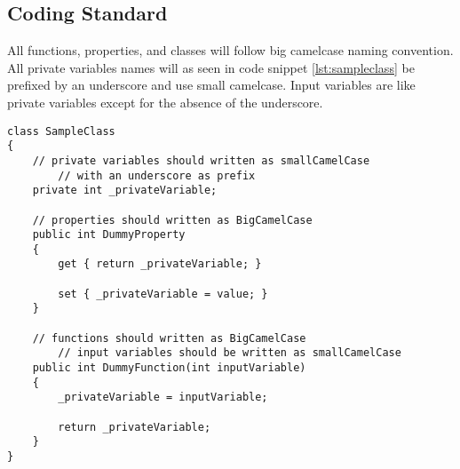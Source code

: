 \subsection{Coding Standard}
\label{subsec:coding_standard}
All functions, properties, and classes will follow big camelcase naming convention.
All private variables names will as seen in code snippet \ref{lst:sampleclass} be prefixed by an underscore and use small camelcase.
Input variables are like private variables except for the absence of the underscore.

\begin{lstlisting}[style=sourceCode, caption=\myCaption{SampleClass.cs}, label=lst:sampleclass]
class SampleClass
{
    // private variables should written as smallCamelCase
		// with an underscore as prefix
    private int _privateVariable;

    // properties should written as BigCamelCase
    public int DummyProperty
    {
        get { return _privateVariable; }
				
        set { _privateVariable = value; }
    }

    // functions should written as BigCamelCase
		// input variables should be written as smallCamelCase
    public int DummyFunction(int inputVariable)
    {
        _privateVariable = inputVariable;

        return _privateVariable;
    }
}
\end{lstlisting}
